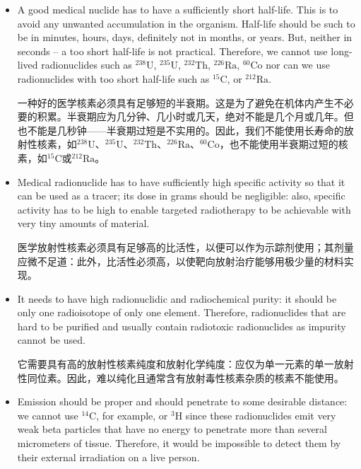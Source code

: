 \documentclass[dvipsnames, svgnames,a4paper,11pt]{article}
\begin{document}
\begin{itemize}


      \item A good medical nuclide has to have a sufficiently short half-life. This is to avoid any unwanted accumulation in the organism. Half-life should be such to be in minutes, hours, days, definitely not in months, or years. But, neither in seconds – a too short half-life is not practical. Therefore, we cannot use long-lived radionuclides such as ${}^\text{238}\text{U}$, ${}^\text{235}\text{U}$, ${}^\text{232}\text{Th}$, ${}^\text{226}\text{Ra}$, ${}^\text{60}\text{Co}$ nor can we use radionuclides with too short half-life such as ${}^\text{15}\text{C}$, or ${}^\text{212}\text{Ra}$.

            一种好的医学核素必须具有足够短的半衰期。这是为了避免在机体内产生不必要的积累。半衰期应为几分钟、几小时或几天，绝对不能是几个月或几年。但也不能是几秒钟——半衰期过短是不实用的。因此，我们不能使用长寿命的放射性核素，如${}^\text{238}\text{U}$、${}^\text{235}\text{U}$、${}^\text{232}\text{Th}$、${}^\text{226}\text{Ra}$、${}^\text{60}\text{Co}$，也不能使用半衰期过短的核素，如${}^\text{15}\text{C}$或${}^\text{212}\text{Ra}$。


      \item Medical radionuclide has to have sufficiently high specific activity so that it can be used as a tracer; its dose in grams should be negligible: also, specific activity has to be high to enable targeted radiotherapy to be achievable with very tiny amounts of material.

            医学放射性核素必须具有足够高的比活性，以便可以作为示踪剂使用；其剂量应微不足道：此外，比活性必须高，以使靶向放射治疗能够用极少量的材料实现。

      \item It needs to have high radionuclidic and radiochemical purity: it should be only one radioisotope of only one element. Therefore, radionuclides that are hard to be purified and usually contain radiotoxic radionuclides as impurity cannot be used.

            它需要具有高的放射性核素纯度和放射化学纯度：应仅为单一元素的单一放射性同位素。因此，难以纯化且通常含有放射毒性核素杂质的核素不能使用。

      \item Emission should be proper and should penetrate to some desirable distance: we cannot use ${}^\text{14}\text{C}$, for example, or ${}^\text{3}\text{H}$ since these radionuclides emit very weak beta particles that have no energy to penetrate more than several micrometers of tissue. Therefore, it would be impossible to detect them by their external irradiation on a live person.


\end{itemize}
\end{document}
